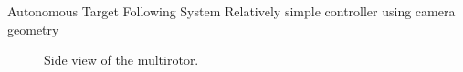 \documentclass[9pt]{beamer}
\begin{document}
\begin{frame}{Autonomous Target Following System}
Relatively simple controller using camera geometry
\begin{figure}[thpb]
	\centering
	\caption{Side view of the multirotor.}
	\label{side_view}
\end{figure}
\end{frame}
\end{document}
